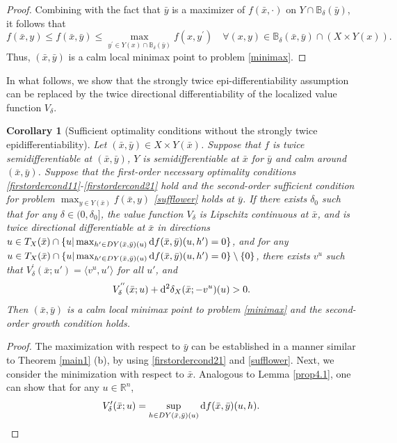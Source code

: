 \documentclass[11pt]{article}
\numberwithin{equation}{section}
\newtheorem{corollary}{Corollary}[section]
\begin{document}
{\begin{proof}
Combining with the fact that $\bar y$ is a  maximizer of $f(\bar x,\cdot)$ on $ Y\cap \mathbb{B}_\delta(\bar y)$, it follows that
$$f(\bar x, y) \leq f(\bar x,\bar y)\leq \max _{y^{\prime}  \in  Y(x)\cap \mathbb{B}_\delta(\bar y)} f\left(x, y^{\prime}\right) \quad \forall (x,y) \in \mathbb{B}_\delta(\bar x,\bar y) \cap (X\times Y(x)).$$
Thus, $(\bar x, \bar y)$ is a calm local minimax point to problem \eqref{minimax}.
\end{proof}



In what follows, we show that the strongly twice epi-differentiability assumption can be replaced by the twice directional differentiability of  the localized value function $V_\delta$. 

	
\begin{corollary}[Sufficient optimality conditions without the strongly twice epidifferentiability]\label{sufficient2}
	Let $(\bar x, \bar y)\in X \times Y(\bar x)$. Suppose that $f$ is twice semidifferentiable at $(\bar x, \bar y)$, $Y$ is semidifferentiable at $\bar x$ for $\bar y$ and calm around $(\bar x,\bar y)$. Suppose that the first-order necessary optimality conditions \eqref{firstordercond11}-\eqref{firstordercond21}  hold and the second-order sufficient condition for  problem $\max_{y\in Y(\bar x)} f(\bar x, y)$ \eqref{sufflower} holds at $\bar y$.
		If there exists $\delta_0$ such that  for any $\delta \in (0,\delta_0]$, the value function $V_{\delta}$ is Lipschitz continuous at $\bar x$,  and is twice directional differentiable at $\bar x$ in directions  $u\in  T_{ X}(\bar x) \cap \{u|\max_{h'\in DY(\bar x,\bar y)(u)}{\rm d} f(\bar x,\bar y)(u,h') =  0\}$, and for any  $u\in  T_{ X}(\bar x) \cap \{u|\max_{h'\in DY(\bar x,\bar y)(u)}{\rm d} f(\bar x,\bar y)(u,h') =  0\} \setminus \{0\}$, there exists $v^u$ such that $V^{\prime}_{\delta}(\bar x;u') = \langle v^u, u' \rangle$ for all $u'$, and
		\begin{equation}\label{cor4.1suf}
			V^{''}_{\delta}(\bar x;u) + {\rm d}^2 \delta_X(\bar x;-v^u)(u) > 0.
			\end{equation}
		Then $(\bar x,\bar y)$ is a calm local minimax point to problem \eqref{minimax} and  the  second-order growth condition holds.
\end{corollary}
\begin{proof}
The maximization with respect to $\bar y$ can be established in a manner similar to Theorem \ref{main1} (b), by using \eqref{firstordercond21} and \eqref{sufflower}. 
	Next, we consider the minimization with respect to $\bar x$. 
	Analogous to Lemma \ref{prop4.1}, one can show that  for any $u \in \mathbb{R}^n$,
	$$V^{\prime}_{\delta}(\bar x;u) = \sup\limits_{h \in D Y(\bar x,\bar y)(u)} {\rm d} f(\bar x,\bar y)(u,h).$$


\end{proof}}
\end{document}
